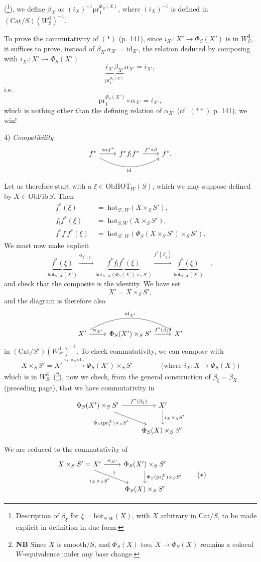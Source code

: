 \documentclass[11pt]{article}
\newcommand{\printedpage}[1]{\marginpar{\footnotesize p.~#1}}
\newcommand{\msp}[1]{\marginpar{\footnotesize [#1]}}
\newcommand{\HOT}{\mathrm{HOT}}
\newcommand{\hot}{\mathrm{hot}}
\newcommand{\Cat}{\mathrm{Cat}}
\newcommand{\id}{\mathrm{id}}
\newcommand{\pr}{\mathrm{pr}}
\newcommand{\Ob}{\mathrm{Ob}}
\newcommand{\Wd}{W^{\mathrm{d}}}
\begin{document}
(\footnote[70]{Description of $\beta_\xi$ for $\xi=\hot_{S,W}(X)$, with $X$ arbitrary in $\Cat/S$, to be made explicit in definition in due form.}), we define $\beta_X$ as $(i_X)^{-1}\pr_1^{\Phi_S(X)}$, where $(i_X)^{-1}$ is defined in $(\Cat/S)(\Wd_S)^{-1}$.

To prove the commutativity of $(*)$ (p. 141), since $i_{X'} : X'\longrightarrow\Phi_S(X')$ is in $\Wd_S$, it suffices to prove, instead of $\beta_{X'}\alpha_{X'} = \id_{X'}$, the relation deduced by composing with $i_{X'} : X'\longrightarrow\Phi_S(X')$
\[
\underbrace{i_{X'}\beta_{X'}}_{\pr_1^{\Phi_S(X')}}\alpha_{X'} = i_{X'},
\]
i.e.
\[
\pr_1^{\Phi_S(X')}\circ\alpha_{X'} = i_{X'},
\]
which is nothing other than the defining relation of $\alpha_{X'}$ (cf. $(**)$ p. 141), we win!

4) \textit{Compatibility}
\[
\begin{tikzcd}
f^* \arrow[r, "\alpha*f^*"] \arrow[rr, bend right, "\id"'] & f^*f_!f^* \arrow[r, "f^**\beta"] & f^*.
\end{tikzcd}
\]

\printedpage{88}
\leavevmode\msp{page 144}Let us therefore start with a $\xi\in\Ob\HOT_W(S)$, which we may suppose defined by $X\in\Ob\underline{\mathrm{Fib}}\,S$. Then
\[
\begin{aligned}
f^*(\xi) &\;=\; \hot_{S',W}(X\times_S S'),\\
f_!f^*(\xi) &\;=\; \hot_{S,W}(X\times_S S'),\\
f^*f_!f^*(\xi) &\;=\; \hot_{S',W}(\Phi_S(X\times_S S')\times_S S').
\end{aligned}
\]
We must now make explicit
\[
\underbrace{f^*(\xi)}_{\hot_{S',W}(X')} \xrightarrow{\alpha_{f^*(\xi)}} \underbrace{f^*f_!f^*(\xi)}_{\hot_{S',W}(\Phi_S(X')\times_S S')} \xrightarrow{f^*(\beta_\xi)} \underbrace{f^*(\xi)}_{\hot_{S',W}(X')} \quad ,
\]
and check that the composite is the identity. We have set
\[
X' = X\times_S S',
\]
and the diagram is therefore also
\[
\begin{tikzcd}
X' \arrow[r, "{\alpha_{X'}}"] \arrow[rr, bend left, "{\id_{X'}}"] & \Phi_S(X')\times_S S' \arrow[r, "f^*(\beta_\xi)"] & X' %
\end{tikzcd}
\]
in $(\Cat/S')(\Wd_{S'})^{-1}$. To check commutativity, we can compose with
\[
X\times_S S' = X' \xrightarrow{i_X\times_S\id_{S'}} \Phi_S(X')\times_S S' \qquad\qquad \text{(where } i_X : X\longrightarrow\Phi_S(X)\text{)}
\]
which is in $\Wd_{S'}$ (\footnote[71]{\textbf{NB} Since $X$ is smooth$/S$, and $\Phi_S(X)$ too, $X\longrightarrow\Phi_S(X)$ remains a colocal $W$-equivalence under any base change.}), now we check, from the general construction of $\beta_\xi=\beta_X$ (preceding page), that we have commutativity in
\[
\begin{tikzcd}
\Phi_S(X')\times_S S' \arrow[r, "f^*(\beta_\xi)"] \arrow[dr, "\Phi_S(\pr_1^X)\times_S S'"'] & X' \arrow[d, "i_X\times_S S'"] \\
 & \Phi_S(X)\times_S S'.
\end{tikzcd}
\]

\leavevmode\msp{page 145}We are reduced to the commutativity of
\[
\begin{tikzcd}
X\times_S S' = X' \arrow[r, "{\alpha_{X'}}"] \arrow[dr, "i_X\times_S S'"', "?"] & \Phi_S(X')\times_S S' \arrow[d, "\Phi_S(\pr_1^X)\times_S S'"] \\
 & \Phi_S(X)\times_S S'
\end{tikzcd}
\tag*{$(*)$}
\]
\end{document}
